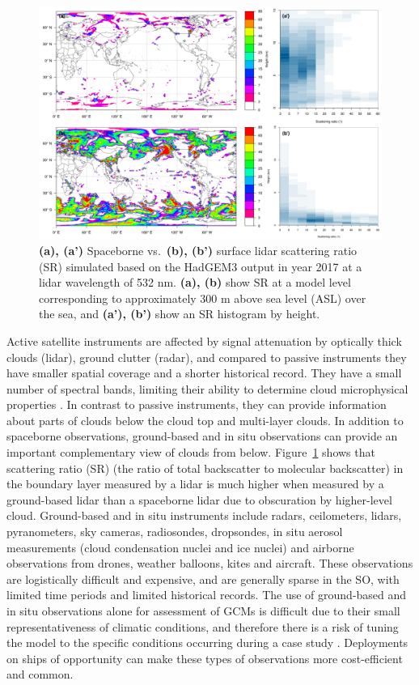 \begin{figure}[t]
\centering
\centerline{\includegraphics[width=1.12\textwidth]{fig/space_vs_surface_lidar.png}}
\caption[Spaceborne vs.~surface lidar scattering ratio]{
\textbf{(a), (a')} Spaceborne vs.~\textbf{(b), (b')} surface lidar scattering ratio
(SR) simulated based on the HadGEM3 output in
year 2017 at a lidar wavelength of 532 nm.
\textbf{(a), (b)} show SR at a model level corresponding to approximately 300 m
above sea level (ASL) over the sea, and \textbf{(a'), (b')} show an SR histogram by height.
}
\label{fig:1:surface-vs-spaceborne-lidar}
\end{figure}

Active satellite instruments are affected by signal attenuation by
optically thick
clouds (lidar), ground clutter (radar), and compared to passive instruments they have smaller spatial coverage
and a shorter historical record. They have a small number of spectral bands, limiting their
ability to determine cloud microphysical properties \citep{noh2017,mace2018a,mace2018b,gettelman2020}.
In contrast to passive instruments, they can provide information about parts of clouds below
the cloud top and multi-layer clouds.
In addition to spaceborne observations, ground-based and in situ
observations can provide an important complementary view of clouds from below.
Figure\ \ref{fig:1:surface-vs-spaceborne-lidar} shows that scattering ratio (SR)
(the ratio of total backscatter to molecular backscatter)
in the boundary layer measured by a lidar is much higher when measured by 
a ground-based lidar than a spaceborne lidar due to obscuration by higher-level
cloud.
Ground-based and in situ instruments include radars, ceilometers, lidars,
pyranometers, sky cameras, radiosondes, dropsondes, in situ aerosol measurements
(cloud condensation nuclei and ice nuclei) and airborne observations from
drones, weather balloons, kites and aircraft. These observations are logistically
difficult and expensive, and are generally sparse in the SO, with
limited time periods and limited historical records. The use of ground-based and
in situ observations alone for assessment of GCMs is difficult due to their
small representativeness of climatic conditions, and therefore there
is a risk of tuning the model to the specific conditions occurring during a
case study \citep{jakob2003}. Deployments on ships of opportunity can make these types
of observations more cost-efficient and common.

